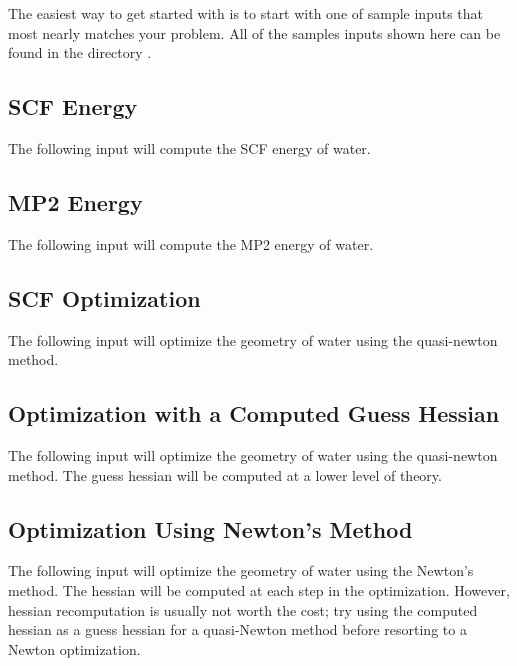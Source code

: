 The easiest way to get started with  is to start with
one of sample inputs that most nearly matches your problem.  All
of the samples inputs shown here can be found in the directory
.

\subsection{SCF Energy}

The following input will compute the SCF energy of water.



\subsection{MP2 Energy}

The following input will compute the MP2 energy of water.



\subsection{SCF Optimization}

The following input will optimize the geometry of water using
the quasi-newton method.



\subsection{Optimization with a Computed Guess Hessian}

The following input will optimize the geometry of water using
the quasi-newton method.  The guess hessian will be computed
at a lower level of theory.



\subsection{Optimization Using Newton's Method}

The following input will optimize the geometry of water using the Newton's
method.  The hessian will be computed at each step in the optimization.
However, hessian recomputation is usually not worth the cost; try using the
computed hessian as a guess hessian for a quasi-Newton method before
resorting to a Newton optimization.

